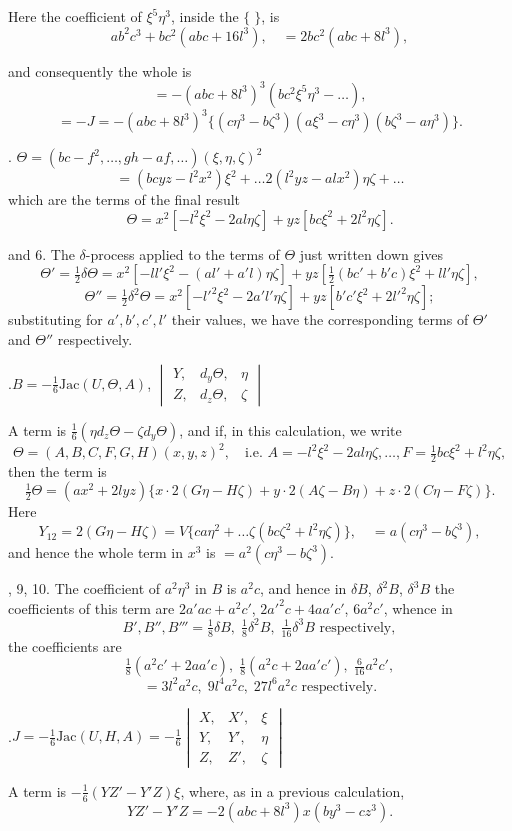 \documentclass[11pt,a4paper]{article}
\begin{document}
Here the coefficient of $\xi^{5}\eta^{3}$, inside the $\{\;\}$, is
\[
  ab^{2}c^{3}+bc^{2}(abc+16l^{3}),\quad =2bc^{2}(abc+8l^{3}),
\]

\newpage
\noindent
and consequently the whole is
\[
  =-(abc+8l^{3})^{3}(bc^{2}\xi^{5}\eta^{3}-\ldots),
\]
\[
  =-J=-(abc+8l^{3})^{3}\{(c\eta^{3}-b\zeta^{3})(a\xi^{3}-c\eta^{3})(b\zeta^{3}-a\eta^{3})\}.
\]

\medskip{}. \quad $\Theta = (bc-f^{2},\ldots,gh-af,\ldots)(\xi,\eta,\zeta)^{2}$
\[
  =(bcyz-l^{2}x^{2})\xi^{2}+\ldots 2(l^{2}yz-alx^{2})\eta\zeta+\ldots
\]
which are the terms of the final result
\[
  \Theta = x^{2}[-l^{2}\xi^{2}-2al\eta\zeta]+yz[bc\xi^{2}+2l^{2}\eta\zeta].
\]

\medskip{} and 6. The $\delta$-process applied to the terms of $\Theta$ just
written down gives
\[
  \Theta' = \tfrac{1}{2}\delta\Theta = x^{2}[-ll'\xi^{2}-(al'+a'l)\eta\zeta]+yz[\tfrac{1}{2}(bc'+b'c)\xi^{2}+ll'\eta\zeta],
\]
\[
  \Theta'' = \tfrac{1}{2}\delta^{2}\Theta = x^{2}[-l'^{2}\xi^{2}-2a'l'\eta\zeta]+yz[b'c'\xi^{2}+2l'^{2}\eta\zeta];
\]
substituting for $a',b',c',l'$ their values, we have the corresponding
terms of $\Theta'$ and $\Theta''$ respectively.

\medskip{}.\quad $B=-\tfrac{1}{6}\mathrm{Jac}(U,\Theta,A)$,\quad
$\begin{vmatrix} Y,&d_{y}\Theta,&\eta\\ Z,&d_{z}\Theta,&\zeta \end{vmatrix}$

A term is $\tfrac{1}{6}(\eta d_{z}\Theta-\zeta d_{y}\Theta)$, and if, in this calculation, we write
\[
  \Theta=(A,B,C,F,G,H)(x,y,z)^{2},\quad\text{i.e.\ }A=-l^{2}\xi^{2}-2al\eta\zeta,\ldots,F=\tfrac{1}{2}bc\xi^{2}+l^{2}\eta\zeta,
\]
then the term is
\[
  \tfrac{1}{2}\Theta=(ax^{2}+2lyz)\{x\cdot 2(G\eta-H\zeta)+y\cdot 2(A\zeta-B\eta)+z\cdot 2(C\eta-F\zeta)\}.
\]
Here
\[
  Y_{12}=2(G\eta-H\zeta)=V\{ca\eta^{2}+\ldots\zeta(bc\zeta^{2}+l^{2}\eta\zeta)\},\quad =a(c\eta^{3}-b\zeta^{3}),
\]
and hence the whole term in $x^{3}$ is $=a^{2}(c\eta^{3}-b\zeta^{3})$.

\medskip{}, 9, 10. The coefficient of $a^{2}\eta^{3}$ in $B$ is $a^{2}c$, and
hence in $\delta B$, $\delta^{2}B$, $\delta^{3}B$ the coefficients of
this term are $2a'ac+a^{2}c'$, $2a'^{2}c+4aa'c'$, $6a^{2}c'$, whence in
\[
  B', B'', B''' = \tfrac{1}{8}\delta B,\;\tfrac{1}{8}\delta^{2}B,\;\tfrac{1}{16}\delta^{3}B\text{ respectively},
\]
the coefficients are
\[
  \tfrac{1}{8}(a^{2}c'+2aa'c),\;\tfrac{1}{8}(a^{2}c+2aa'c'),\;\tfrac{6}{16}a^{2}c',
\]
\[
  =3l^{2}a^{2}c,\;9l^{4}a^{2}c,\;27l^{6}a^{2}c\text{ respectively}.
\]

\medskip{}.\quad $J=-\tfrac{1}{6}\mathrm{Jac}(U,H,A)=-\tfrac{1}{6}\begin{vmatrix} X,&X',&\xi\\ Y,&Y',&\eta\\ Z,&Z',&\zeta \end{vmatrix}$

A term is $-\tfrac{1}{6}(YZ'-Y'Z)\xi$, where, as in a previous calculation,
\[
  YZ'-Y'Z=-2(abc+8l^{3})x(by^{3}-cz^{3}).
\]
\end{document}
